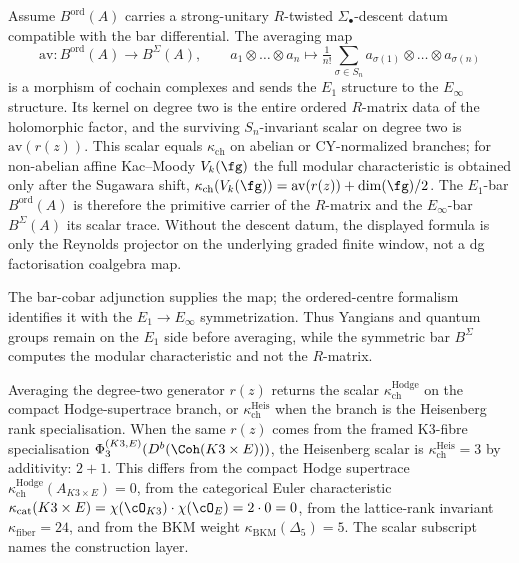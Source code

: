 \begin{proposition}
\label{prop:averaging-e1-einfty}
Assume $B^{\mathrm{ord}}(A)$ carries a strong-unitary $R$-twisted
$\Sigma_\bullet$-descent datum compatible with the bar differential.
The averaging map
\[
 \mathrm{av} \colon B^{\mathrm{ord}}(A) \longrightarrow B^{\Sigma}(A),
 \qquad
 a_1 \otimes \dots \otimes a_n
 \longmapsto
 \tfrac{1}{n!}\sum_{\sigma \in S_n}
 a_{\sigma(1)} \otimes \dots \otimes a_{\sigma(n)}
\]
is a morphism of cochain complexes and sends the $E_1$ structure to
the $E_\infty$ structure. Its kernel on degree two is the entire
ordered $R$-matrix data of the holomorphic factor, and the surviving
$S_n$-invariant scalar on degree two is $\mathrm{av}(r(z))$. This
scalar equals $\kappa_{\mathrm{ch}}$ on abelian or CY-normalized
branches; for non-abelian affine Kac--Moody $V_k(\fg)$ the full
modular characteristic is obtained only after the Sugawara shift,
$\kappa_{\mathrm{ch}}(V_k(\fg))=\mathrm{av}(r(z))+\dim(\fg)/2$. The
$E_1$-bar $B^{\mathrm{ord}}(A)$ is therefore the primitive carrier of
the $R$-matrix and the $E_\infty$-bar $B^{\Sigma}(A)$ its scalar trace.
Without the descent datum, the displayed formula is only the Reynolds
projector on the underlying graded finite window, not a dg
factorisation coalgebra map.
\end{proposition}

The bar-cobar adjunction supplies the map; the ordered-centre formalism identifies it with the $E_1 \to E_\infty$ symmetrization. Thus Yangians and quantum groups remain on the $E_1$ side before averaging, while the symmetric bar $B^\Sigma$ computes the modular characteristic and not the $R$-matrix.

Averaging the degree-two generator $r(z)$ returns the scalar $\kappa_{\mathrm{ch}}^{\mathrm{Hodge}}$ on the compact Hodge-supertrace branch, or $\kappa_{\mathrm{ch}}^{\mathrm{Heis}}$ when the branch is the Heisenberg rank specialisation. When the same $r(z)$ comes from the framed K3-fibre specialisation $\Phi_3^{(K3,E)}(D^b(\Coh(K3 \times E)))$, the Heisenberg scalar is $\kappa_{\mathrm{ch}}^{\mathrm{Heis}} = 3$ by additivity: $2 + 1$. This differs from the compact Hodge supertrace $\kappa_{\mathrm{ch}}^{\mathrm{Hodge}}(A_{K3\times E})=0$, from the categorical Euler characteristic $\kappa_{\mathrm{cat}}(K3 \times E) = \chi(\cO_{K3}) \cdot \chi(\cO_E) = 2 \cdot 0 = 0$, from the lattice-rank invariant $\kappa_{\mathrm{fiber}} = 24$, and from the BKM weight $\kappa_{\mathrm{BKM}}(\Delta_5) = 5$. The scalar subscript names the construction layer.

